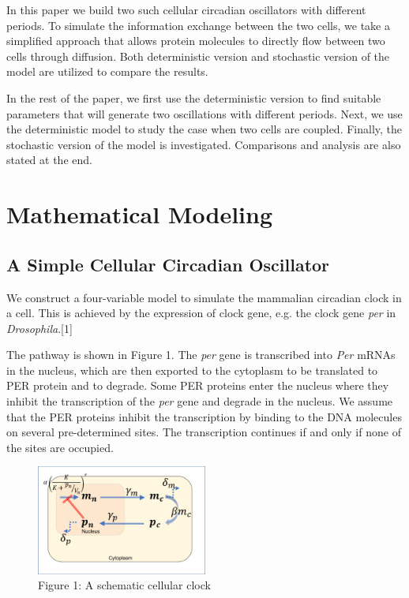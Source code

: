 \documentclass[12pt]{article}
\renewcommand{\(}{\left (}
\renewcommand{\)}{\right )}
\begin{document}
In this paper we build two such cellular circadian oscillators with different periods. To simulate the information exchange between the two cells, we take a simplified approach that allows protein molecules to directly flow between two cells through diffusion. Both deterministic version and stochastic version of the model are utilized to compare the results.

In the rest of the paper, we first use the deterministic version to find suitable parameters that will generate two oscillations with different periods. Next, we use the deterministic model to study the case when two cells are coupled. Finally, the stochastic version of the model is investigated. Comparisons and analysis are also stated at the end.

\section{Mathematical Modeling}
\subsection{A Simple Cellular Circadian Oscillator}
\hspace{5mm} We construct a four-variable model to simulate the mammalian circadian clock in a cell. This is achieved by the expression of clock gene, e.g. the clock gene \textit{per} in \textit{Drosophila}.[1]

The pathway is shown in Figure 1. The \textit{per} gene is transcribed into \textit{Per} mRNAs in the nucleus, which are then exported to the cytoplasm to be translated to PER protein and to degrade. Some PER proteins enter the nucleus where they inhibit the transcription of the \textit{per} gene and degrade in the nucleus. We assume that the PER proteins inhibit the transcription by binding to the DNA molecules on several pre-determined sites. The transcription continues if and only if none of the sites are occupied.


\begin {figure}[h]
	\centering
	\includegraphics[width=0.5\textwidth]{pathway.png}
	\caption*{\small Figure 1: A schematic cellular clock}
\end {figure}
\end{document}
